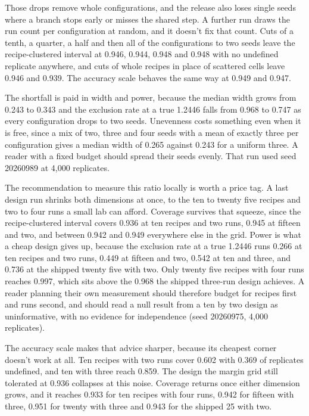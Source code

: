 Those drops remove whole configurations, and the release also loses single seeds where a branch stops early or misses the shared step. A further run draws the run count per configuration at random, and it doesn't fix that count. Cuts of a tenth, a quarter, a half and then all of the configurations to two seeds leave the recipe-clustered interval at 0.946, 0.944, 0.948 and 0.948 with no undefined replicate anywhere, and cuts of whole recipes in place of scattered cells leave 0.946 and 0.939. The accuracy scale behaves the same way at 0.949 and 0.947.

The shortfall is paid in width and power, because the median width grows from 0.243 to 0.343 and the exclusion rate at a true 1.2446 falls from 0.968 to 0.747 as every configuration drops to two seeds. Unevenness costs something even when it is free, since a mix of two, three and four seeds with a mean of exactly three per configuration gives a median width of 0.265 against 0.243 for a uniform three. A reader with a fixed budget should spread their seeds evenly. That run used seed 20260989 at 4,000 replicates.

The recommendation to measure this ratio locally is worth a price tag. A last design run shrinks both dimensions at once, to the ten to twenty five recipes and two to four runs a small lab can afford. Coverage survives that squeeze, since the recipe-clustered interval covers 0.936 at ten recipes and two runs, 0.945 at fifteen and two, and between 0.942 and 0.949 everywhere else in the grid. Power is what a cheap design gives up, because the exclusion rate at a true 1.2446 runs 0.266 at ten recipes and two runs, 0.449 at fifteen and two, 0.542 at ten and three, and 0.736 at the shipped twenty five with two. Only twenty five recipes with four runs reaches 0.997, which sits above the 0.968 the shipped three-run design achieves. A reader planning their own measurement should therefore budget for recipes first and runs second, and should read a null result from a ten by two design as uninformative, with no evidence for independence (seed 20260975, 4,000 replicates).

The accuracy scale makes that advice sharper, because its cheapest corner doesn't work at all. Ten recipes with two runs cover 0.602 with 0.369 of replicates undefined, and ten with three reach 0.859. The design the margin grid still tolerated at 0.936 collapses at this noise. Coverage returns once either dimension grows, and it reaches 0.933 for ten recipes with four runs, 0.942 for fifteen with three, 0.951 for twenty with three and 0.943 for the shipped 25 with two.

